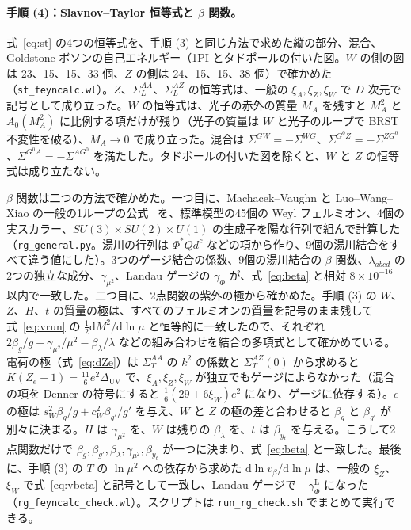 \documentclass[a4paper,10pt]{ltjsarticle}
\newcommand{\dd}{\mathrm{d}}
\newcommand{\DUV}{\Delta_{\mathrm{UV}}}
\begin{document}
\paragraph{手順 (4)：Slavnov--Taylor 恒等式と $\beta$ 関数。}式~\eqref{eq:st} の4つの恒等式を、手順 (3) と同じ方法で求めた縦の部分、混合、Goldstone ボソンの自己エネルギー（1PI とタドポールの付いた図。$W$ の側の図は 23、15、15、33 個、$Z$ の側は 24、15、15、38 個）で確かめた（\texttt{st\_feyncalc.wl}）。$Z$、$\Sigma^{AA}_L$、$\Sigma^{AZ}_L$ の恒等式は、一般の $\xi_A,\xi_Z,\xi_W$ で $D$ 次元で記号として成り立った。$W$ の恒等式は、光子の赤外の質量 $M_A$ を残すと $M_A^2$ と $A_0(M_A^2)$ に比例する項だけが残り（光子の質量は $W$ と光子のループで BRST 不変性を破る）、$M_A\to0$ で成り立った。混合は $\Sigma^{GW}=-\Sigma^{WG}$、$\Sigma^{G^0Z}=-\Sigma^{ZG^0}$、$\Sigma^{G^0A}=-\Sigma^{AG^0}$ を満たした。タドポールの付いた図を除くと、$W$ と $Z$ の恒等式は成り立たない。

$\beta$ 関数は二つの方法で確かめた。一つ目に、Machacek--Vaughn と Luo--Wang--Xiao の一般の1ループの公式~\cite{mv1,mv2,mv3,luo03} を、標準模型の45個の Weyl フェルミオン、4個の実スカラー、$SU(3)\times SU(2)\times U(1)$ の生成子を陽な行列で組んで計算した（\texttt{rg\_general.py}。湯川の行列は $\Phi^*Qd^c$ などの項から作り、9個の湯川結合をすべて違う値にした）。3つのゲージ結合の係数、9個の湯川結合の $\beta$ 関数、$\lambda_{abcd}$ の2つの独立な成分、$\gamma_{\mu^2}$、Landau ゲージの $\gamma_\Phi$ が、式~\eqref{eq:beta} と相対 $8\times10^{-16}$ 以内で一致した。二つ目に、2点関数の紫外の極から確かめた。手順 (3) の $W$、$Z$、$H$、$t$ の質量の極は、すべてのフェルミオンの質量を記号のまま残して式~\eqref{eq:vrun} の $\frac12\dd M^2/\dd\ln\mu$ と恒等的に一致したので、それぞれ $2\beta_g/g+\gamma_{\mu^2}/\mu^2-\beta_\lambda/\lambda$ などの組み合わせを結合の多項式として確かめている。電荷の極（式~\eqref{eq:dZe}）は $\Sigma^{AA}_T$ の $k^2$ の係数と $\Sigma^{AZ}_T(0)$ から求めると $K(Z_e-1)=\frac{11}6e^2\DUV$ で、$\xi_A,\xi_Z,\xi_W$ が独立でもゲージによらなかった（混合の項を Denner の符号にすると $\frac16(29+6\xi_W)e^2$ になり、ゲージに依存する）。$e$ の極は $s_W^2\beta_g/g+c_W^2\beta_{g'}/g'$ を与え、$W$ と $Z$ の極の差と合わせると $\beta_g$ と $\beta_{g'}$ が別々に決まる。$H$ は $\gamma_{\mu^2}$ を、$W$ は残りの $\beta_\lambda$ を、$t$ は $\beta_{y_t}$ を与える。こうして2点関数だけで $\beta_g,\beta_{g'},\beta_\lambda,\gamma_{\mu^2},\beta_{y_t}$ が一つに決まり、式~\eqref{eq:beta} と一致した。最後に、手順 (3) の $T$ の $\ln\mu^2$ への依存から求めた $\dd\ln v_\beta/\dd\ln\mu$ は、一般の $\xi_Z$、$\xi_W$ で式~\eqref{eq:vbeta} と記号として一致し、Landau ゲージで $-\gamma_\Phi^{\mathrm L}$ になった（\texttt{rg\_feyncalc\_check.wl}）。スクリプトは \texttt{run\_rg\_check.sh} でまとめて実行できる。
\end{document}

